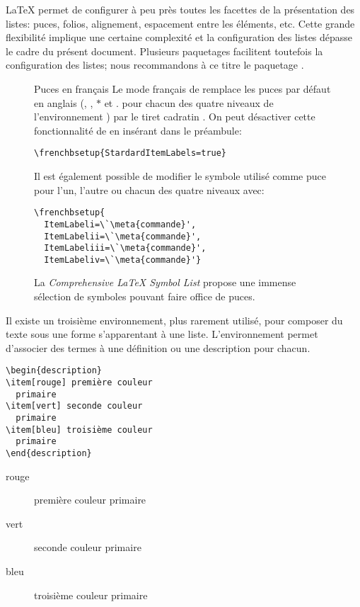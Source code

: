 {\LaTeX} permet de configurer à peu près toutes les facettes de la
présentation des listes: puces, folios, alignement, espacement entre
les éléments, etc. Cette grande flexibilité implique une certaine
complexité et la configuration des listes dépasse le cadre du présent
document. Plusieurs paquetages facilitent toutefois la configuration
des listes; nous recommandons à ce titre le paquetage 
\citep{enumitem}.

\begin{figure}[t]
  \begin{emphbox}{Puces en français}
    Le mode français de  remplace les puces par défaut en
    anglais ({\textbullet}, {\textendash}, $\ast$ et $.$ pour chacun
    des quatre niveaux de l'environnement ) par le tiret
    cadratin {\textemdash}. On peut désactiver cette fonctionnalité de
     en insérant dans le préambule:
\begin{lstlisting}
\frenchbsetup{StardardItemLabels=true}
\end{lstlisting}
    Il est également possible de modifier le symbole utilisé comme
    puce pour l'un, l'autre ou chacun des quatre niveaux avec:
\begin{lstlisting}
\frenchbsetup{
  ItemLabeli=\`\meta{commande}',
  ItemLabelii=\`\meta{commande}',
  ItemLabeliii=\`\meta{commande}',
  ItemLabeliv=\`\meta{commande}'}
\end{lstlisting}
    La \emph{Comprehensive {\LaTeX} Symbol List} \citep{comprehensive}
    propose une immense sélection de symboles pouvant faire office de
    puces.
  \end{emphbox}
\end{figure}

Il existe un troisième environnement, plus rarement utilisé, pour
composer du texte sous une forme s'apparentant à une liste.
L'environnement  permet d'associer des termes à une
définition ou une description pour chacun.
\begin{demo}
  \begin{texample}
\begin{lstlisting}
\begin{description}
\item[rouge] première couleur
  primaire
\item[vert] seconde couleur
  primaire
\item[bleu] troisième couleur
  primaire
\end{description}
\end{lstlisting}
    \producing
\begin{description}
\item[rouge] première couleur primaire
\item[vert] seconde couleur primaire
\item[bleu] troisième couleur primaire
\end{description}
  \end{texample}
\end{demo}


